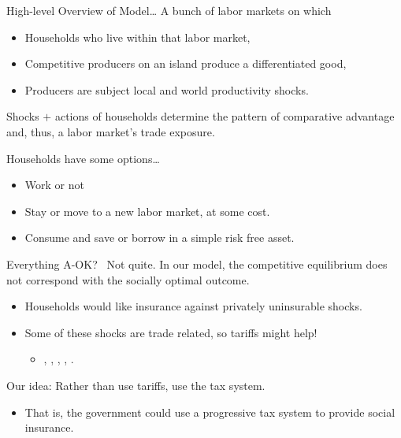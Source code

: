 \documentclass[9pt,pdftex]{beamer}
\theoremstyle{definition}
\begin{document}

\begin{frame}[t]{High-level Overview of Model\ldots}
A bunch of labor markets on which
\begin{itemize}
\item Households who live within that labor market,
\smallskip
\item Competitive producers on an island produce a differentiated good,
\smallskip
\item Producers are subject local and world productivity shocks.
\end{itemize}
\smallskip
Shocks $+$ actions of households determine the pattern of comparative advantage and, thus, a labor market's trade exposure. \\
\bigskip

Households have some options\ldots
\begin{itemize}
\item Work or not
\smallskip
\item Stay or move to a new labor market, at some cost.
\smallskip
\item Consume and save or borrow in a simple risk free asset.
\end{itemize}

\end{frame}


\begin{frame}[t]{Everything A-OK? \ Not quite.}
In our model, the competitive equilibrium does not correspond with the socially optimal outcome.\\
\begin{itemize}
\item Households would like insurance against privately uninsurable shocks.
\smallskip
\item Some of these shocks are trade related, so tariffs might help!
\begin{itemize}
\smallskip
\item \small \citet{Corden_74}, \citet{baldwin1982political}, \citet{newbery1984pareto}, \citet{Eaton85}, \citet{dixit1987trade, Dixit_89, dixit1989trade}.
\end{itemize}
\end{itemize}
\bigskip
Our idea: Rather than use tariffs, use the tax system.
\begin{itemize}
\item That is, the government could use a progressive tax system to provide social insurance.
\end{itemize}
\end{frame}
\end{document}
